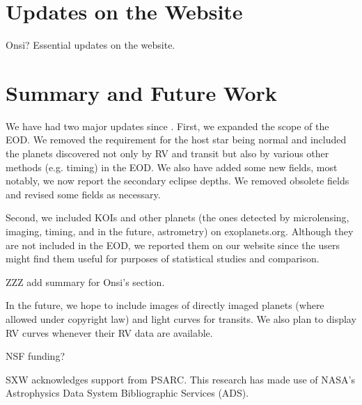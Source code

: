 \documentclass[11pt,preprint]{aastex}
\begin{document}
\begin{CJK*}{UTF8}{gbsn}
\section{Updates on the Website}\label{sec:website}

Onsi? Essential updates on the website.


\section{Summary and Future Work}\label{sec:summary}

We have had two major updates since \cite{Wright2011}. First, we
expanded the scope of the EOD. We removed the requirement for the host star being normal and included the planets discovered not only by RV and transit but also by various other methods (e.g. timing) in the EOD. We also have added some new fields, most notably, we now report the secondary eclipse depths. We removed obsolete fields and revised some fields as necessary. 

Second, we included KOIs and other planets (the ones detected by microlensing, imaging, timing, and in the future, astrometry) on exoplanets.org. Although they are not included in the EOD, we reported them on our website since the users might find them useful for purposes of statistical studies and comparison.  

ZZZ add summary for Onsi's section.


In the future, we hope to include images of directly imaged planets (where allowed under copyright law) and
light curves for transits. We also plan to display RV curves whenever their RV data are available. 


\acknowledgments

NSF funding?

SXW acknowledges support from PSARC. This research has made use of
NASA's Astrophysics Data System Bibliographic Services (ADS). 





\clearpage


\end{CJK*}
\end{document}
